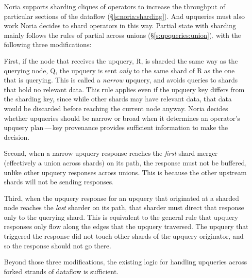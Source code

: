 Noria supports sharding cliques of operators to increase the throughput of
particular sections of the dataflow (\S\ref{s:noria:sharding}). And upqueries
must also work Noria decides to shard operators in this way. Partial state with
sharding mainly follows the rules of partial across unions
(\S\ref{s:upqueries:union}), with the following three modifications:

First, if the node that receives the upquery, R, is sharded the same way as the
querying node, Q, the upquery is sent \emph{only} to the same shard of R as the
one that is querying. This is called a \textit{narrow} upquery, and avoids
queries to shards that hold no relevant data. This rule applies even if the
upquery key differs from the sharding key, since while other shards may have
relevant data, that data would be discarded before reaching the current node
anyway. Noria decides whether upqueries should be narrow or broad when it
determines an operator's upquery plan\,---\,key provenance provides sufficient
information to make the decision.

Second, when a narrow upquery response reaches the \emph{first} shard merger
(effectively a union across shards) on its path, the response must not be
buffered, unlike other upquery responses across unions. This is because
the other upstream shards will not be sending responses.

Third, when the upquery response for an upquery that originated at a sharded
node reaches the \emph{last} sharder on its path, that sharder must direct that
response only to the querying shard. This is equivalent to the general rule that
upquery responses only flow along the edges that the upquery traversed. The
upquery that triggered the response did not touch other shards of the upquery
originator, and so the response should not go there.

Beyond those three modifications, the existing logic for handling upqueries
across forked strands of dataflow is sufficient.

